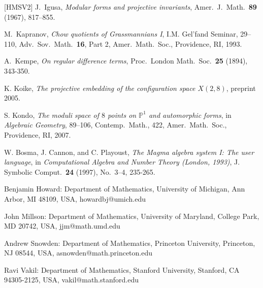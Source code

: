 \documentclass{amsart}
\theoremstyle{definition}
\theoremstyle{remark}
\def\P{\mathbb{P}}
\begin{document}
\begin{thebibliography}{[HMSV2]}
 J.\ Igusa, {\em Modular forms and projective invariants},
Amer.\ J.\ Math.\ {\bf 89} (1967), 817--855.

 M.\ Kapranov, {\em Chow quotients of Grassmannians I},
I.M. Gel'fand Seminar, 29--110, Adv.\ Sov.\ Math.\ {\bf 16}, Part 2,
Amer.\ Math.\ Soc., Providence, RI, 1993.

A.\ Kempe, \emph{On regular difference terms}, Proc.\ London Math.\ Soc.\
{\bf 25} (1894), 343-350.

 K. Koike, {\em The projective embedding of the
configuration space $X(2,8)$}, preprint 2005.

 S. Kondo, {\em The moduli space of $8$ points on $\P^1$
and automorphic forms}, in {\em Algebraic Geometry}, 89--106, Contemp.\ Math.,
422, Amer.\ Math.\ Soc., Providence, RI, 2007.

W. Bosma, J. Cannon, and C. Playoust, {\em The Magma algebra system I: The
user language}, in {\em Computational Algebra and Number Theory (London,
1993)}, J. Symbolic Comput.\ {\bf 24} (1997), No.\ 3--4, 235-265.

\end{thebibliography}

\bigskip

{\tiny

Benjamin Howard:
Department of Mathematics,
University of  Michigan,
Ann Arbor, MI 48109, USA,
howardbj@umich.edu

\smallskip

John Millson:
Department of Mathematics,
University of Maryland,
College Park, MD 20742, USA,
jjm@math.umd.edu

\smallskip

Andrew Snowden:
Department of Mathematics,
Princeton University,
Princeton, NJ 08544, USA,
asnowden@math.princeton.edu

\smallskip

Ravi Vakil:
Department of Mathematics,
Stanford University,
Stanford, CA 94305-2125, USA,
vakil@math.stanford.edu

}
\end{document}
